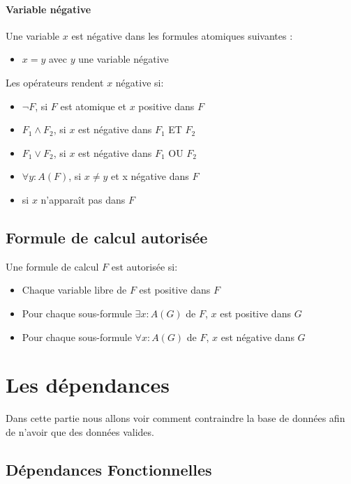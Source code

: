 \documentclass[10pt,a4paper]{article}
\begin{document}
\paragraph{Variable négative \\}
Une variable $x$ est négative dans les formules atomiques suivantes :
\begin{itemize}
\item $x=y$ avec $y$ une variable négative
\end{itemize}

Les opérateurs rendent $x$ négative si:
\begin{itemize}
\item $\neg F$, si $F$ est atomique et $x$ positive dans $F$
\item $F_{1} \wedge F_{2}$, si $x$ est négative dans $F_{1}$ ET $F_{2}$
\item $F_{1} \vee F_{2}$, si $x$ est négative dans $F_{1}$ OU $F_{2}$
\item $\forall y : A(F)$, si $x \neq y$ et x négative dans $F$
\item si $x$ n’apparaît pas dans $F$
\end{itemize}

\subsection{Formule de calcul autorisée}

Une formule de calcul $F$ est autorisée si:
\begin{itemize}
\item Chaque variable libre de $F$ est positive dans $F$
\item Pour chaque sous-formule $\exists x : A(G)$ de $F$, $x$ est positive dans $G$
\item Pour chaque sous-formule $\forall x : A(G)$ de $F$, $x$ est négative dans $G$
\end{itemize}

\section{Les dépendances}

Dans cette partie nous allons voir comment contraindre la base de données afin de n'avoir que des données valides.

\subsection{Dépendances Fonctionnelles}
\end{document}
